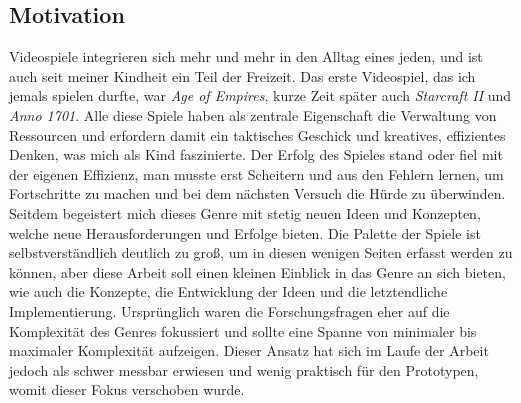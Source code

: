 \subsection{Motivation}
Videospiele integrieren sich mehr und mehr in den Alltag eines jeden, und ist auch seit meiner Kindheit ein Teil der Freizeit. Das erste Videospiel, das ich jemals spielen durfte, war \textit{Age of Empires}, kurze Zeit später auch \textit{Starcraft II} und \textit{Anno 1701}. Alle diese Spiele haben als zentrale Eigenschaft die Verwaltung von Ressourcen und erfordern damit ein taktisches Geschick und kreatives, effizientes Denken, was mich als Kind faszinierte. Der Erfolg des Spieles stand oder fiel mit der eigenen Effizienz, man musste erst Scheitern und aus den Fehlern lernen, um Fortschritte zu machen und bei dem nächsten Versuch die Hürde zu überwinden. Seitdem begeistert mich dieses Genre mit stetig neuen Ideen und Konzepten, welche neue Herausforderungen und Erfolge bieten. Die Palette der Spiele ist selbstverständlich deutlich zu groß, um in diesen wenigen Seiten erfasst werden zu können, aber diese Arbeit soll einen kleinen Einblick in das Genre an sich bieten, wie auch die Konzepte, die Entwicklung der Ideen und die letztendliche Implementierung. Ursprünglich waren die Forschungsfragen eher auf die Komplexität des Genres fokussiert und sollte eine Spanne von minimaler bis maximaler Komplexität aufzeigen. Dieser Ansatz hat sich im Laufe der Arbeit jedoch als schwer messbar erwiesen und wenig praktisch für den Prototypen, womit dieser Fokus verschoben wurde.